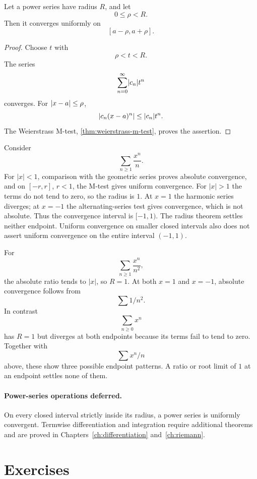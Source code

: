\begin{theorem}
\label{thm:power-uniform-inside}
Let a power series have radius $R$, and let
\[
0\leq\rho<R.
\]
Then it converges uniformly on
\[
[a-\rho,a+\rho].
\]
\end{theorem}
\begin{proof}
Choose $t$ with
\[
\rho<t<R.
\]
The series
\[
\sum_{n=0}^{\infty}\lvert c_n\rvert t^n
\]
converges. For $\lvert x-a\rvert\leq\rho$,
\[
\lvert c_n(x-a)^n\rvert\leq\lvert c_n\rvert t^n.
\]
The Weierstrass M-test, \cref{thm:weierstrass-m-test}, proves the assertion.
\end{proof}

\begin{example}
Consider
\[
\sum_{n\geq1}\frac{x^n}{n}.
\]
 For $|x|<1$, comparison with the
geometric series proves absolute convergence, and on $[-r,r]$, $r<1$,
the M-test gives uniform convergence. For $|x|>1$ the terms do not
tend to zero, so the radius is $1$. At $x=1$ the harmonic series
diverges; at $x=-1$ the alternating-series test gives convergence,
which is not absolute. Thus the convergence interval is $[-1,1)$.
The radius theorem settles neither endpoint. Uniform convergence on
smaller closed intervals also does not assert uniform convergence on
the entire interval $(-1,1)$.
\end{example}
\begin{example}
For
\[
\sum_{n\geq1}\frac{x^n}{n^2},
\]
 the absolute ratio tends to $|x|$,
so $R=1$. At both $x=1$ and $x=-1$, absolute convergence follows
from
\[
\sum1/n^2.
\]
 In contrast
\[
\sum_{n\geq0}x^n
\]
 has $R=1$ but
diverges at both endpoints because its terms fail to tend to zero.
Together with
\[
\sum x^n/n
\]
 above, these show three possible endpoint
patterns. A ratio or root limit of $1$ at an endpoint settles none of them.
\end{example}

\paragraph{Power-series operations deferred.}
On every closed interval strictly inside its radius, a power series is uniformly convergent. Termwise differentiation and integration require additional theorems and are proved in Chapters~\ref{ch:differentiation} and~\ref{ch:riemann}.





\section*{Exercises}


